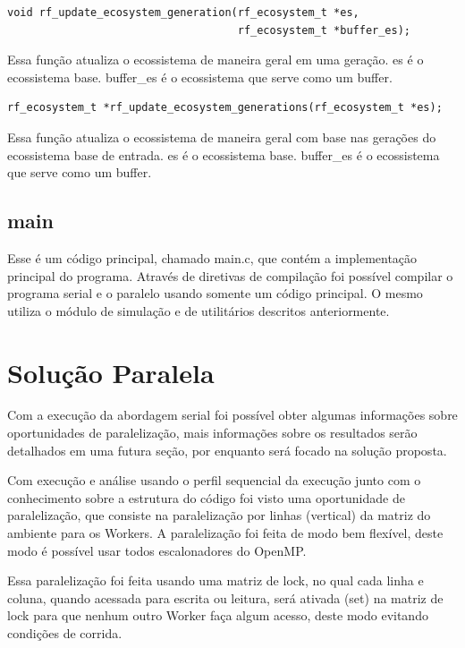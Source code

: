 \documentclass[12pt]{article}
\begin{document}
\begin{verbatim}
void rf_update_ecosystem_generation(rf_ecosystem_t *es,
                                    rf_ecosystem_t *buffer_es);
      \end{verbatim}

Essa função atualiza o ecossistema de maneira geral em uma geração.
es é o ecossistema base.
buffer\_es é o ecossistema que serve como um buffer.


\begin{verbatim}
rf_ecosystem_t *rf_update_ecosystem_generations(rf_ecosystem_t *es);
      \end{verbatim}


Essa função atualiza o ecossistema de maneira geral com base nas gerações do ecossistema base de entrada.
es é o ecossistema base.
buffer\_es é o ecossistema que serve como um buffer.


\subsection{main}

Esse é um código principal, chamado main.c, que contém a implementação principal do programa. Através de diretivas de compilação foi possível compilar o programa serial e o paralelo usando somente um código principal. O mesmo utiliza o módulo de simulação e de utilitários descritos anteriormente.

\section{Solução Paralela}

Com a execução da abordagem serial foi possível obter algumas informações sobre oportunidades de paralelização, mais informações sobre os resultados serão detalhados em uma futura seção, por enquanto será focado na solução proposta.

Com execução e análise usando o perfil sequencial da execução junto com o conhecimento sobre a estrutura do código foi visto uma oportunidade de paralelização, que consiste na paralelização por linhas (vertical) da matriz do ambiente para os Workers. A paralelização foi feita de modo bem flexível, deste modo é possível usar todos escalonadores do OpenMP.

Essa paralelização foi feita usando uma matriz de lock, no qual cada linha e coluna, quando acessada para escrita ou leitura, será ativada (set) na matriz de lock para que nenhum outro Worker faça algum acesso, deste modo evitando condições de corrida.
\end{document}
